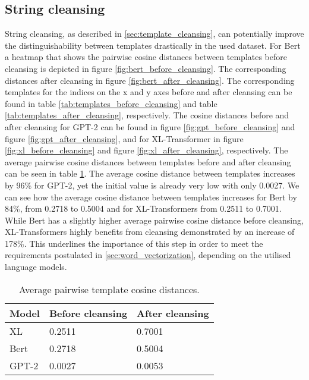 \subsection{String cleansing}
String cleansing, as described in \ref{sec:template_cleansing}, can potentially improve the distinguishability between templates drastically in the used dataset.
For Bert a heatmap that shows the pairwise cosine distances between templates before cleansing is depicted in figure \ref{fig:bert_before_cleansing}. The corresponding distances after cleansing in figure \ref{fig:bert_after_cleansing}. The corresponding templates for the indices on the x and y axes before and after cleansing can be found in table \ref{tab:templates_before_cleansing} and table \ref{tab:templates_after_cleansing}, respectively.
The cosine distances before and after cleansing for GPT-2 can be found in figure \ref{fig:gpt_before_cleansing} and figure \ref{fig:gpt_after_cleansing}, and for XL-Transformer in figure \ref{fig:xl_before_cleansing} and figure \ref{fig:xl_after_cleansing}, respectively. The average pairwise cosine distances between templates before and after cleansing can be seen in table \ref{tab:average_pairwise_cos_distances}.
The average cosine distance between templates increases by 96\% for GPT-2, yet the initial value is already very low with only 0.0027. We can see how the average cosine distance between templates increases for Bert by 84\%, from 0.2718 to 0.5004 and for XL-Transformers from 0.2511 to 0.7001. While Bert has a slightly higher average pairwise cosine distance before cleansing, XL-Transformers highly benefits from cleansing demonstrated by an increase of 178\%. This underlines the importance of this step in order to meet the requirements postulated in \ref{sec:word_vectorization}, depending on the utilised language models.



\begin{table}[ht]
\centering
\begin{small}
\begin{tabular}{ p{1.3cm} p{2.5cm} p{2.5cm} }
\toprule
Model & Before cleansing & After cleansing\\
\midrule
XL & 0.2511 & 0.7001\\
Bert & 0.2718 & 0.5004\\
GPT-2 & 0.0027 & 0.0053 \\ 

\bottomrule
\end{tabular}
\caption{Average pairwise template cosine distances.}
\label{tab:average_pairwise_cos_distances}
\end{small}
\end{table}


